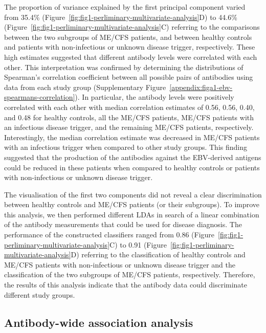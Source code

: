 The proportion of variance explained by the first principal component varied from 35.4\% (Figure~\ref{fig:fig1-perliminary-multivariate-analysis}D) to 44.6\% (Figure~\ref{fig:fig1-perliminary-multivariate-analysis}C) referring to the comparisons between the two subgroups of ME/CFS patients, and between healthy controls and patients with non-infectious or unknown disease trigger, respectively. These high estimates suggested that different antibody levels were correlated with each other. This interpretation was confirmed by determining the distributions of Spearman's correlation coefficient between all possible pairs of antibodies using data from each study group (Supplementary Figure~\ref{appendix:figa1-ebv-spearmans-correlation}). In particular, the antibody levels were positively correlated with each other with median correlation estimates of 0.56, 0.56, 0.40, and 0.48 for healthy controls, all the ME/CFS patients, ME/CFS patients with an infectious disease trigger, and the remaining ME/CFS patients, respectively. Interestingly, the median correlation estimate was decreased in ME/CFS patients with an infectious trigger when compared to other study groups. This finding suggested that the production of the antibodies against the EBV-derived antigens could be reduced in these patients when compared to healthy controls or patients with non-infectious or unknown disease trigger.


The visualisation of the first two components did not reveal a clear discrimination between healthy controls and ME/CFS patients (or their subgroups). To improve this analysis, we then performed different LDAs in search of a linear combination of the antibody measurements that could be used for disease diagnosis. The performance of the constructed classifiers ranged from 0.86 (Figure~\ref{fig:fig1-perliminary-multivariate-analysis}C) to 0.91 (Figure~\ref{fig:fig1-perliminary-multivariate-analysis}D) referring to the classification of healthy controls and ME/CFS patients with non-infectious or unknown disease trigger and the classification of the two subgroups of ME/CFS patients, respectively. Therefore, the results of this analysis indicate that the antibody data could discriminate different study groups.

\subsection{Antibody-wide association analysis}

